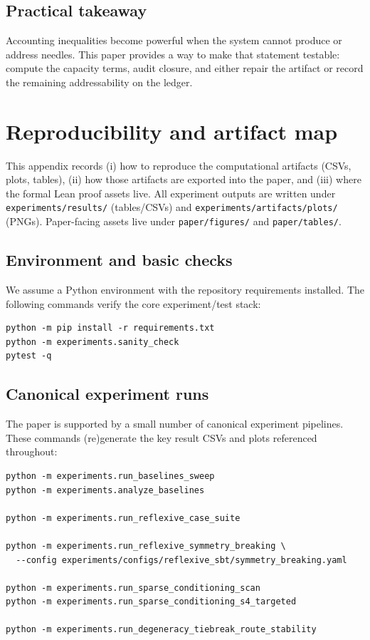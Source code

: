 \documentclass[11pt]{article}
\theoremstyle{plain}
\theoremstyle{definition}
\theoremstyle{remark}
\begin{document}
\subsection{Practical takeaway}\label{subsec:practical_takeaway}

Accounting inequalities become powerful when the system cannot produce or address needles.
This paper provides a way to make that statement testable:
compute the capacity terms, audit closure, and either repair the artifact or record the remaining addressability on the ledger.
 
\appendix
\section{Reproducibility and artifact map}\label{app:repro}\label{sec:reproducibility}

This appendix records (i) how to reproduce the computational artifacts (CSVs, plots, tables), (ii) how those artifacts are exported into the paper, and (iii) where the formal Lean proof assets live.
All experiment outputs are written under \texttt{experiments/results/} (tables/CSVs) and \texttt{experiments/artifacts/plots/} (PNGs).
Paper-facing assets live under \texttt{paper/figures/} and \texttt{paper/tables/}.

\subsection{Environment and basic checks}

We assume a Python environment with the repository requirements installed.
The following commands verify the core experiment/test stack:

\begin{verbatim}
python -m pip install -r requirements.txt
python -m experiments.sanity_check
pytest -q
\end{verbatim}

\subsection{Canonical experiment runs}

The paper is supported by a small number of canonical experiment pipelines.
These commands (re)generate the key result CSVs and plots referenced throughout:

\begin{verbatim}
python -m experiments.run_baselines_sweep
python -m experiments.analyze_baselines

python -m experiments.run_reflexive_case_suite

python -m experiments.run_reflexive_symmetry_breaking \
  --config experiments/configs/reflexive_sbt/symmetry_breaking.yaml

python -m experiments.run_sparse_conditioning_scan
python -m experiments.run_sparse_conditioning_s4_targeted

python -m experiments.run_degeneracy_tiebreak_route_stability
\end{verbatim}
\end{document}
